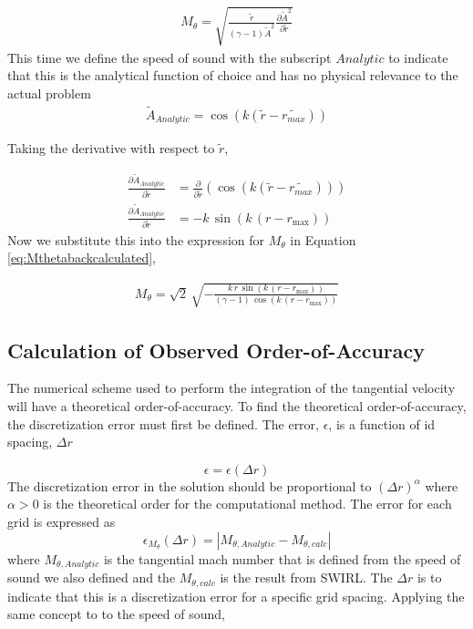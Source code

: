 \documentclass[12pt]{article}
\begin{document}
\begin{align*}
    M_{\theta} = \sqrt{ \frac{\widetilde{r}}{(\gamma -1) \widetilde{A}^2} 
    \frac{\partial \widetilde{A}^2}{\partial \widetilde{r}}}
\end{align*}
This time we define the speed of sound with the subscript $Analytic$ to indicate 
that this is the analytical function of choice and has no physical relevance 
to the actual problem
\begin{align*}
    \widetilde{A}_{Analytic} = \cos \left( k \left( \widetilde{r} - \widetilde{r_{max}} \right) \right)
\end{align*}

Taking the derivative with respect to $\widetilde{r}$,

\begin{align*}
    \frac{\partial \widetilde{A}_{Analytic} }{\partial \widetilde{r}} &= 
    \frac{\partial }{\partial \widetilde{r}}\left( 
        \cos \left( k \left( \widetilde{r} - \widetilde{r_{max}} \right) \right)
    \right)\\
    \frac{\partial \widetilde{A}_{Analytic}}{\partial \widetilde{r}} &= 
    -k\,\sin\left(k\,\left(r-r_{\mathrm{max}}\right)\right)
\end{align*}
Now we substitute this into the expression for $M_{\theta}$ in Equation 
\ref{eq:Mthetabackcalculated},

\begin{align*}
    M_{\theta} = \sqrt{2}\,\sqrt{-\frac{k\,r\,\sin\left(k\,\left(r-r_{\mathrm{max}}\right)\right)}{(\gamma - 1)\,\cos\left(k\,\left(r-r_{\mathrm{max}}\right)\right)}}
\end{align*} 



\subsection{Calculation of Observed Order-of-Accuracy}
The numerical scheme used to perform the integration of the tangential velocity
will have a theoretical order-of-accuracy. To find the theoretical order-of-accuracy,
the discretization error must first be defined. The error, $\epsilon$, is a function of id spacing, $\Delta r$

\[ \epsilon = \epsilon(\Delta r) \]
The discretization error in the solution should be proportional to 
$\left( \Delta r \right)^{\alpha}$ where $\alpha > 0$ is the theoretical order
for the computational method.  The error for each grid is expressed as 
\[ \epsilon_{M_{\theta}}(\Delta r) = |M_{\theta,Analytic}-M_{\theta,calc}|\]
where $M_{\theta,Analytic}$ is the tangential mach number that is defined from the
speed of sound we also defined and the $M_{\theta,calc}$ is the result from 
SWIRL. The $\Delta r$ is to indicate that this is a discretization error for a
specific grid spacing. Applying the same concept to to the speed of sound,
\end{document}
